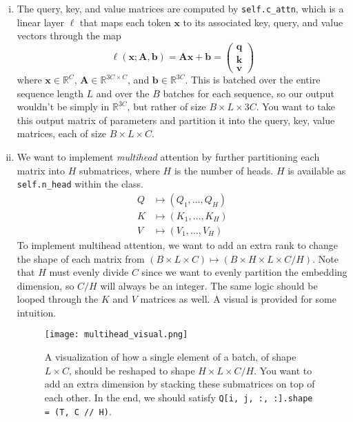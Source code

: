 \documentclass{exam}
\begin{document}
\begin{enumerate}[i.]
    \item The query, key, and value matrices are computed by \texttt{self.c\_attn}, which is a linear layer $\ell$ that maps each token $\mathbf{x}$ to its associated key, query, and value vectors through the map
    \begin{equation}
        \ell(\mathbf{x}; \mathbf{A}, \mathbf{b}) = \mathbf{A} \mathbf{x} + \mathbf{b} = \begin{pmatrix} \mathbf{q} \\ \mathbf{k} \\ \mathbf{v} \end{pmatrix}
    \end{equation}
    where $\mathbf{x} \in \mathbb{R}^{C}$, $\mathbf{A} \in \mathbb{R}^{3C \times C}$, and $\mathbf{b} \in \mathbb{R}^{3C}$. This is batched over the entire sequence length $L$ and over the $B$ batches for each sequence, so our output wouldn't be simply in $\mathbb{R}^{3C}$, but rather of size $B \times L \times 3C$. You want to take this output matrix of parameters and partition it into the query, key, value matrices, each of size $B \times L \times C$. 
    
    \item We want to implement \textit{multihead} attention by further partitioning each matrix into $H$ submatrices, where $H$ is the number of heads. $H$ is available as \texttt{self.n\_head} within the class. 
    \begin{align*}
        Q & \mapsto (Q_1, \ldots, Q_H) \\ 
        K & \mapsto (K_1, \ldots, K_H) \\ 
        V & \mapsto (V_1, \ldots, V_H)
    \end{align*}
    To implement multihead attention, we want to add an extra rank to change the shape of each matrix from $(B \times L \times C) \mapsto (B \times H \times L \times  C/H)$. Note that $H$ must evenly divide $C$ since we want to evenly partition the embedding dimension, so $C/H$ will always be an integer. The same logic should be looped through the $K$ and $V$ matrices as well. A visual is provided for some intuition. 

    \begin{figure}[H]
      \centering 
      \texttt{[image: multihead\_visual.png]}
      \caption{A visualization of how a single element of a batch, of shape $L \times C$, should be reshaped to shape $H \times L \times C/H$. You want to add an extra dimension by stacking these submatrices on top of each other. In the end, we should satisfy \texttt{Q[i, j, :, :].shape = (T, C // H)}.} 
      \label{fig:multihead_visual}
    \end{figure}
    

\end{enumerate}
\end{document}
